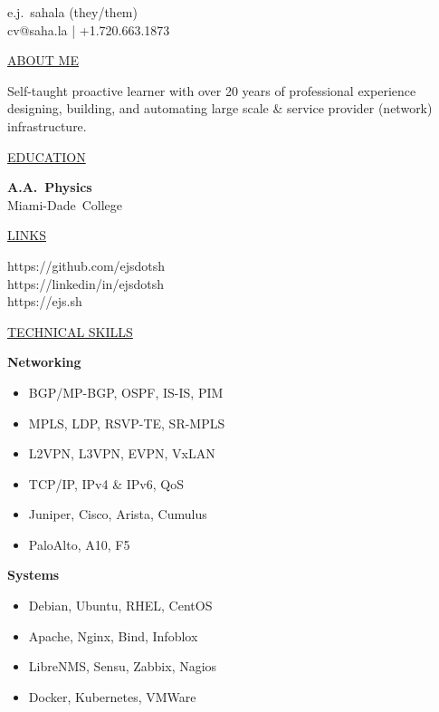 \documentclass[11pt]{article}
\newcommand{\resumetitle}[3]{
    \AddToShipoutPictureBG{
        \AtPageUpperLeft{
        \raisebox{-0.09\paperheight}{
            \color{black!85}\rule{2\paperwidth}{\paperheight}}
        }}
    \begin{Center}
        \begingroup
        \titlethin{}
        \color{black!10}\Huge{#1}
        \titlethick{}
        \color{black!5}\Huge{#2} \\
        \vspace{2mm}
        \textrm{\color{black!15}\Large{#3}}
        \endgroup
    \end{Center}
    \vspace{7mm}
}
\newcommand{\betteruline}[1]{
    \uline{#1}
}
\newcommand{\sectiontitle}[1]{
    \begingroup
        \titlebold{}
        \betteruline{\Large\uppercase{#1}  }
        \vspace{1.7mm}
    \endgroup
}
\newcommand{\sectioncontent}[1]{
    \begingroup
        \begin{FlushLeft}
        \vspace{-3mm}
        \sffamily\small#1
        \end{FlushLeft}
    \endgroup
    \vspace{2mm}
}
\newcommand{\spacevv}{
    \vspace{2mm}
}
\begin{document}
    \resumetitle{}{e.j.\ sahala (they/them)} {
        cv@saha.la |
        +1.720.663.1873
    }

    \setlength{\columnsep}{7mm}
    \begin{paracol}{2}

    \sectiontitle{about me}
    \sectioncontent{
        Self-taught proactive learner with over 20 years of professional experience designing, building, and automating
        large scale \& service provider (network) infrastructure.
    }

    \sectiontitle{education}
    \sectioncontent{
        \textbf{A.A.\ Physics} \\
        Miami-Dade\ College\\
    }

    \sectiontitle{links}
    \sectioncontent{
        \hspace{2mm} {https://github.com/ejsdotsh} \\
        \faIcon{linkedin-in}\hspace{2.1mm} {https://linkedin/in/ejsdotsh} \\
        \faIcon{link}\hspace{1.8mm} {https://ejs.sh}
    }

    \sectiontitle{technical skills}
    \sectioncontent{
        \textbf{Networking} \\
        \begin{itemize}
            \item BGP/MP-BGP, OSPF, IS-IS, PIM
            \item MPLS, LDP, RSVP-TE, SR-MPLS
            \item L2VPN, L3VPN, EVPN, VxLAN
            \item TCP/IP, IPv4 \& IPv6, QoS
            \item Juniper, Cisco, Arista, Cumulus
            \item PaloAlto, A10, F5
        \end{itemize}
        \spacevv{}

        \textbf{Systems} \\
        \begin{itemize}
            \item Debian, Ubuntu, RHEL, CentOS
            \item Apache, Nginx, Bind, Infoblox
            \item LibreNMS, Sensu, Zabbix, Nagios
            \item Docker, Kubernetes, VMWare
        \end{itemize}
        \spacevv{}

}
\end{paracol}
\end{document}
